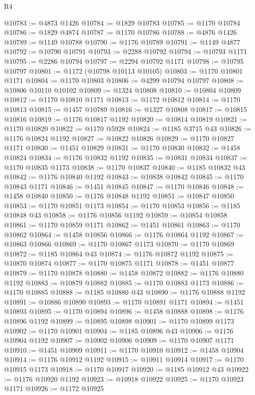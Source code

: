 \begin{lexlean}{R4}
\begin{coremodule}
@10783 := @4873 @1426
@10784 := @1829 @10783
@10785 := @1170 @10784
@10786 := @1829 @4874
@10787 := @1170 @10786
@10788 := @4876 @1426
@10789 := @1149 @10788
@10790 := @1176 @10789
@10791 := @1149 @4877
@10792 := @10790 @10791
@10793 := @2288 @10792
@10794 := @10793 @1171
@10795 := @2286 @10794
@10797 := @2294 @10792 @1171
@10798 := @10795 @10797
@10801 := @1172 (@10798 @10113 @10105)
@10803 := @1170 @10801 @1171
@10804 := @1170 @10803
@10806 := @4299 @10794 @10797
@10808 := @10806 @10110 @10102
@10809 := @1324 @10808
@10810 := @10804 @10809
@10812 := @1170 @10810 @1171
@10813 := @1172 @10812
@10814 := @1170 @10813
@10815 := @1457 @10789
@10816 := @1327 @10808
@10817 := @10815 @10816
@10819 := @1176 @10817 @1192
@10820 := @10814 @10819
@10821 := @1170 @10820
@10822 := @1170 @5928
@10824 := @1185 @3715 @43
@10826 := @1176 @10824 @1192
@10827 := @10822 @10826
@10829 := @1170 @10827 @1171
@10830 := @1451 @10829
@10831 := @1170 @10830
@10832 := @1458 @10824
@10834 := @1176 @10832 @1192
@10835 := @10831 @10834
@10837 := @1170 @10835 @1173
@10838 := @1170 @10837
@10840 := @1185 @10832 @43
@10842 := @1176 @10840 @1192
@10843 := @10838 @10842
@10845 := @1170 @10843 @1171
@10846 := @1451 @10845
@10847 := @1170 @10846
@10848 := @1458 @10840
@10850 := @1176 @10848 @1192
@10851 := @10847 @10850
@10853 := @1170 @10851 @1173
@10854 := @1170 @10853
@10856 := @1185 @10848 @43
@10858 := @1176 @10856 @1192
@10859 := @10854 @10858
@10861 := @1170 @10859 @1171
@10862 := @1451 @10861
@10863 := @1170 @10862
@10864 := @1458 @10856
@10866 := @1176 @10864 @1192
@10867 := @10863 @10866
@10869 := @1170 @10867 @1173
@10870 := @1170 @10869
@10872 := @1185 @10864 @43
@10874 := @1176 @10872 @1192
@10875 := @10870 @10874
@10877 := @1170 @10875 @1171
@10878 := @1451 @10877
@10879 := @1170 @10878
@10880 := @1458 @10872
@10882 := @1176 @10880 @1192
@10883 := @10879 @10882
@10885 := @1170 @10883 @1173
@10886 := @1170 @10885
@10888 := @1185 @10880 @43
@10890 := @1176 @10888 @1192
@10891 := @10886 @10890
@10893 := @1170 @10891 @1171
@10894 := @1451 @10893
@10895 := @1170 @10894
@10896 := @1458 @10888
@10898 := @1176 @10896 @1192
@10899 := @10895 @10898
@10901 := @1170 @10899 @1173
@10902 := @1170 @10901
@10904 := @1185 @10896 @43
@10906 := @1176 @10904 @1192
@10907 := @10902 @10906
@10909 := @1170 @10907 @1171
@10910 := @1451 @10909
@10911 := @1170 @10910
@10912 := @1458 @10904
@10914 := @1176 @10912 @1192
@10915 := @10911 @10914
@10917 := @1170 @10915 @1173
@10918 := @1170 @10917
@10920 := @1185 @10912 @43
@10922 := @1176 @10920 @1192
@10923 := @10918 @10922
@10925 := @1170 @10923 @1171
@10926 := @1172 @10925

\end{coremodule}
\end{lexlean}
